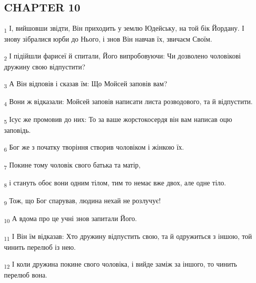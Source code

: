\subsection{CHAPTER 10}
\begin{tcolorbox}
\textsubscript{1} І, вийшовши звідти, Він приходить у землю Юдейську, на той бік Йордану. І знову зібралися юрби до Нього, і знов Він навчав їх, звичаєм Своїм.
\end{tcolorbox}
\begin{tcolorbox}
\textsubscript{2} І підійшли фарисеї й спитали, Його випробовуючи: Чи дозволено чоловікові дружину свою відпустити?
\end{tcolorbox}
\begin{tcolorbox}
\textsubscript{3} А Він відповів і сказав їм: Що Мойсей заповів вам?
\end{tcolorbox}
\begin{tcolorbox}
\textsubscript{4} Вони ж відказали: Мойсей заповів написати листа розводового, та й відпустити.
\end{tcolorbox}
\begin{tcolorbox}
\textsubscript{5} Ісус же промовив до них: То за ваше жорстокосердя він вам написав оцю заповідь.
\end{tcolorbox}
\begin{tcolorbox}
\textsubscript{6} Бог же з початку творіння створив чоловіком і жінкою їх.
\end{tcolorbox}
\begin{tcolorbox}
\textsubscript{7} Покине тому чоловік свого батька та матір,
\end{tcolorbox}
\begin{tcolorbox}
\textsubscript{8} і стануть обоє вони одним тілом, тим то немає вже двох, але одне тіло.
\end{tcolorbox}
\begin{tcolorbox}
\textsubscript{9} Тож, що Бог спарував, людина нехай не розлучує!
\end{tcolorbox}
\begin{tcolorbox}
\textsubscript{10} А вдома про це учні знов запитали Його.
\end{tcolorbox}
\begin{tcolorbox}
\textsubscript{11} І Він їм відказав: Хто дружину відпустить свою, та й одружиться з іншою, той чинить перелюб із нею.
\end{tcolorbox}
\begin{tcolorbox}
\textsubscript{12} І коли дружина покине свого чоловіка, і вийде заміж за іншого, то чинить перелюб вона.
\end{tcolorbox}
